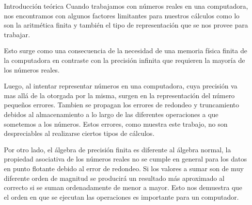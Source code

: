 \begin{section}{Introducción teórica}
	Cuando trabajamos con números reales en una computadora,
	nos encontramos con algunos factores limitantes para nuestros cálculos
	como lo son la aritmética finita y
	también el tipo de representación que se nos provee para trabajar.

	Esto surge como una consecuencia de la necesidad
	de una memoria física finita de la computadora
	en contraste con la precisión infinita
	que requieren la mayoría de los números reales.

	Luego, al intentar representar números en una computadora,
	cuya precisión va mas allá de la otorgada por la misma,
	surgen en la representación del número pequeños errores.
	Tambien se propagan los errores de redondeo y truncamiento debidos al almacenamiento a lo largo 
	de las diferentes operaciones a que sometemos a los números.
	Estos errores, como muestra este trabajo, no son despreciables
	al realizarse ciertos tipos de cálculos.
	
	Por otro lado, el álgebra de precisión finita es diferente al álgebra normal, la propiedad asociativa
	de los números reales no se cumple en general para los datos en punto flotante debido al error de redondeo.
	Si los valores a sumar son de muy diferente orden de magnitud se producirá un resultado más aproximado al
	correcto si se suman ordenadamente de menor a mayor. Esto nos demuestra que el orden en que se ejecutan las
	operaciones es importante para un computador.
\end{section}
